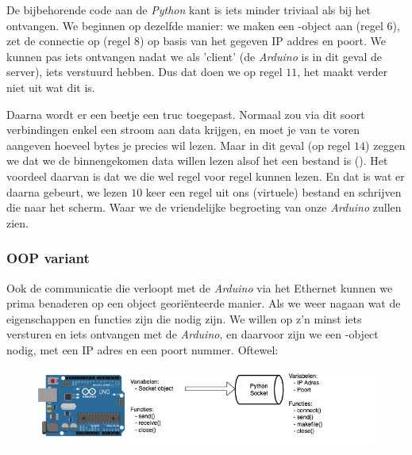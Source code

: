 \newpage 

De bijbehorende code aan de \textit{Python} kant is iets minder triviaal als bij het ontvangen. 
We beginnen op dezelfde manier: we maken een -object aan (regel $6$), zet de connectie op (regel $8$) op basis van het gegeven IP addres en poort. We kunnen pas iets ontvangen nadat we als 'client' (de \textit{Arduino} is in dit geval de server), iets verstuurd hebben. Dus dat doen we op regel $11$, het maakt verder niet uit wat dit is. \newline

Daarna wordt er een beetje een truc toegepast. Normaal zou via dit soort verbindingen enkel een stroom aan data krijgen, en moet je van te voren aangeven hoeveel bytes je precies wil lezen. Maar in dit geval (op regel $14$) zeggen we dat we de binnengekomen data willen lezen alsof het een bestand is (). Het voordeel daarvan is dat we die wel regel voor regel kunnen lezen. 
En dat is wat er daarna gebeurt, we lezen $10$ keer een regel uit ons (virtuele) bestand  en schrijven die naar het scherm. Waar we de vriendelijke begroeting van onze \textit{Arduino} zullen zien. 

\subsubsection{OOP variant}
Ook de communicatie die verloopt met de \textit{Arduino} via het Ethernet kunnen we prima benaderen op een object georiënteerde manier. Als we weer nagaan wat de eigenschappen en functies zijn die nodig zijn. We willen op z'n minst iets versturen en iets ontvangen met de \textit{Arduino}, en daarvoor zijn we een -object nodig, met een IP adres en een poort nummer. Oftewel:

\begin{figure}[h!]
\centering\includegraphics[scale=0.7]{Pictures/chapter08/socket_oop.png}
\label{fig:socket_oop} %
\end{figure}


